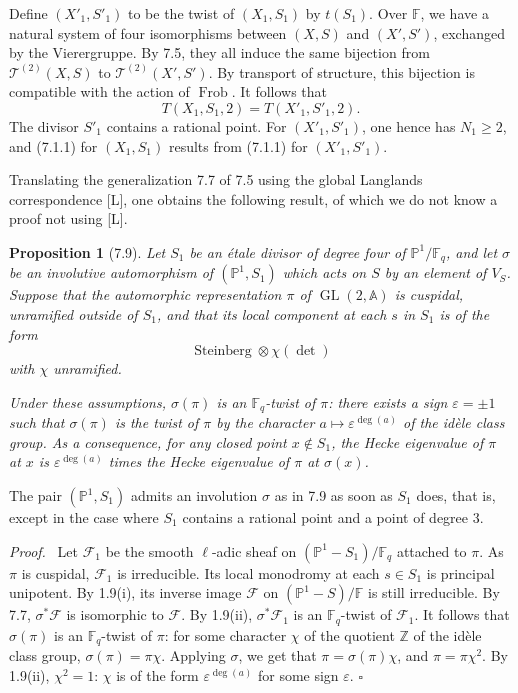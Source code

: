 \documentclass[10pt]{article}
\newcommand{\Fq}{\mathbb F_q}
\newcommand{\Fb}{\mathbb F}
\newcommand{\Z}{\mathbb Z}
\newcommand{\Adele}{\mathbb A}
\newcommand{\GL}{\operatorname{GL}}
\newcommand{\Frob}{\operatorname{Frob}}
\newcommand{\detm}{\operatorname{det}}
\theoremstyle{deligne}
\newtheorem*{proposition*}{Proposition}
\newenvironment{proofdel}[1][Proof.]{\textit{#1}\ }{\hfill$\square$}
\newcommand{\Stein}{\operatorname{Steinberg}}
\newcommand{\heading}[1]{\vspace{0.7em}\noindent{\bfseries #1}\quad}
\begin{document}
\heading{7.8. End of Proof of 7.1.} Define $(X'_1,S'_1)$ to be the twist of $(X_1,S_1)$ by $t(S_1)$. Over $\Fb$, we have a natural system of four isomorphisms between $(X,S)$ and $(X',S')$, exchanged by the Vierergruppe. By 7.5, they all induce the same bijection from $\mathcal T^{(2)}(X,S)$ to $\mathcal T^{(2)}(X',S')$. By transport of structure, this bijection is compatible with the action of $\Frob$. It follows that
\[
T(X_1,S_1,2)=T(X'_1,S'_1,2).
\]
The divisor $S'_1$ contains a rational point. For $(X'_1,S'_1)$, one hence has $N_1\ge2$, and (7.1.1) for $(X_1,S_1)$ results from (7.1.1) for $(X'_1,S'_1)$.

Translating the generalization 7.7 of 7.5 using the global Langlands correspondence [L], one obtains the following result, of which we do not know a proof not using [L].

\begin{proposition*}[7.9]
Let $S_1$ be an \'{e}tale divisor of degree four of $\mathbb P^1/\Fq$, and let $\sigma$ be an involutive automorphism of $(\mathbb P^1,S_1)$ which acts on $S$ by an element of $V_S$. Suppose that the automorphic representation $\pi$ of $\GL(2,\Adele)$ is cuspidal, unramified outside of $S_1$, and that its local component at each $s$ in $S_1$ is of the form
\[
\Stein\otimes\chi(\detm)
\]
with $\chi$ unramified.

Under these assumptions, $\sigma(\pi)$ is an $\Fq$-twist of $\pi$: there exists a sign $\varepsilon=\pm1$ such that $\sigma(\pi)$ is the twist of $\pi$ by the character $a\mapsto\varepsilon^{\operatorname{deg}(a)}$ of the id\`ele class group. As a consequence, for any closed point $x\notin S_1$, the Hecke eigenvalue of $\pi$ at $x$ is $\varepsilon^{\operatorname{deg}(a)}$ times the Hecke eigenvalue of $\pi$ at $\sigma(x)$.
\end{proposition*}

The pair $(\mathbb P^1,S_1)$ admits an involution $\sigma$ as in 7.9 as soon as $S_1$ does, that is, except in the case where $S_1$ contains a rational point and a point of degree $3$.

\begin{proofdel}
Let $\mathcal F_1$ be the smooth $\ell$-adic sheaf on $(\mathbb P^1-S_1)/\Fq$ attached to $\pi$. As $\pi$ is cuspidal, $\mathcal F_1$ is irreducible. Its local monodromy at each $s\in S_1$ is principal unipotent. By 1.9(i), its inverse image $\mathcal F$ on $(\mathbb P^1-S)/\Fb$ is still irreducible. By 7.7, $\sigma^*\mathcal F$ is isomorphic to $\mathcal F$. By 1.9(ii), $\sigma^*\mathcal F_1$ is an $\Fq$-twist of $\mathcal F_1$. It follows that $\sigma(\pi)$ is an $\Fq$-twist of $\pi$: for some character $\chi$ of the quotient $\Z$ of the id\`ele class group, $\sigma(\pi)=\pi\chi$. Applying $\sigma$, we get that $\pi=\sigma(\pi)\chi$, and $\pi=\pi\chi^2$. By 1.9(ii), $\chi^2=1$: $\chi$ is of the form $\varepsilon^{\operatorname{deg}(a)}$ for some sign $\varepsilon$.
\end{proofdel}
\end{document}
